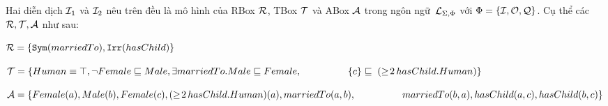 \begin{Example}
	Hai diễn dịch $\mathcal{I}_1$ và $\mathcal{I}_2$ nêu trên đều là mô hình của RBox $\mathcal{R}$, TBox $\mathcal{T}$ và ABox $\mathcal{A}$ trong ngôn ngữ~$\mathcal{L}_{\Sigma,\Phi}$ với $\Phi = \{\mathcal{I}, \mathcal{O}, \mathcal{Q}\}$. Cụ thể các $\mathcal{R}, \mathcal{T}, \mathcal{A}$ như sau:
	
	$\mathcal{R} = \{\mathtt{Sym}(marriedTo), \mathtt{Irr}(hasChild) \}$
	
	$\mathcal{T} = \{Human \equiv \top, \neg Female \sqsubseteq Male, \exists marriedTo.Male \sqsubseteq Female,\\
	~\qquad\qquad\;\,\{c\} \sqsubseteq\;(\geq\!2\,hasChild.Human)\}$
	
	$\mathcal{A} = \{Female(a), Male(b), Female(c), (\geq\!2\,hasChild.Human)(a),
	marriedTo(a,b),\\
	~\qquad\qquad\;\;marriedTo(b,a), hasChild(a,c), hasChild(b,c)\}$
	\myend
\end{Example}

